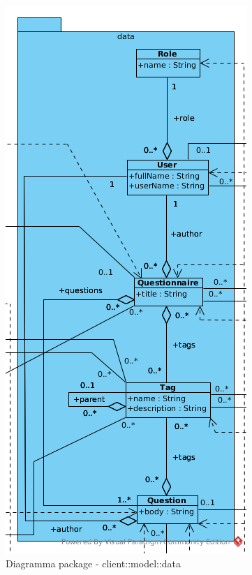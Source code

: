 \begin{center}
		\begin{figure}[H]
			\centering \includegraphics[scale=4, max width=\textwidth, max height=\myheight]{../img/diagrammiClassi/client/model/data.png}
			\caption{Diagramma package - client::model::data}
		\end{figure}
	\end{center}\hypertarget{client::model::data::Questionnaire}{}
